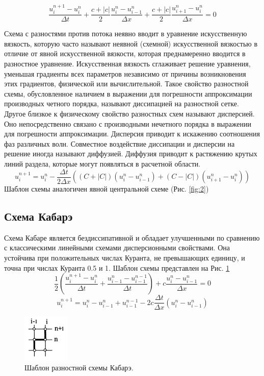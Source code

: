 \begin{equation}
    \frac{u_i^{n+1}-u_i^n}{\Delta t}+\frac{c+|c|}{2}\frac{u_i^n-u_{i-1}^n}{\Delta x}+\frac{c+|c|}{2}\frac{u_{i+1}^n-u_{i}^n}{\Delta x}=0
\end{equation}

Схема с разностями против потока неявно вводит в уравнение искусственную вязкость, которую часто
называют неявной (схемной) искусственной вязкостью в отличие
от явной искусственной вязкости, которая преднамеренно вводится в разностное уравнение. Искусственная вязкость сглаживает
решение уравнения, уменьшая градиенты всех параметров независимо от причины возникновения этих градиентов, физической или вычислительной. Такое свойство разностной схемы, обусловленное наличием в выражении для погрешности аппроксимации производных четного порядка, называют диссипацией на разностной
сетке.
Другое близкое к физическому свойство разностных схем называют дисперсией. Оно непосредственно связано с производными
нечетного порядка в выражении для погрешности аппроксимации.
Дисперсия приводит к искажению соотношения фаз различных
волн. Совместное воздействие диссипации и дисперсии на решение иногда называют диффузией. Диффузия приводит к растяжению крутых линий раздела, которые могут появляться в расчетной
области.
\begin{equation}
    u_i^{n+1}=u_i^n-\frac{\Delta t}{2 \Delta x} ((C+|C|)(u_i^n-u_{i-1}^n)+(C-|C|)(u_{i+1}^n-u_i^n))
\end{equation}
Шаблон схемы аналогичен явной центральной схеме (Рис. \ref{fig:2})
\subsection{Схема Кабарэ}
Схема Кабаре является бездиссипативной и обладает улучшенными по сравнению с
классическими линейными схемами дисперсионными свойствами. Она устойчива при положительных числах Куранта, не превышающих единицу, и точна при числах Куранта 0.5 и 1. Шаблон схемы представлен на Рис. \ref{fig:10}
\begin{equation}
    \frac{1}{2}\left(\frac{u_i^{n+1}-u_i^n}{\Delta t}+\frac{u_{i-1}^{n}-u_{i-1}^{n-1}}{\Delta t}\right) +c \frac{u_i^{n}-u_{i-1}^n}{\Delta x}=0
\end{equation}
\begin{equation}
    u^{n+1}_i=u^n_i-u^n_{i-1}+u^{n-1}_{i-1}-2c\frac{\Delta t}{\Delta x}(u^n_i-u^n_{i-1})
\end{equation}
\begin{figure}[H]
    \centering
    \includegraphics[width=0.2\textwidth]{images/11.png}
    \caption{Шаблон разностной схемы Кабарэ.}
    \label{fig:10}
\end{figure}

